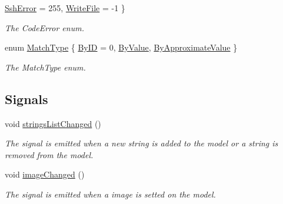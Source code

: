 \begin{DoxyCompactItemize}
\mbox{\hyperlink{classContextualizationController_acb38587f7f9e610a5950956b345d69fda7447fb0b9cf45b0adc6da65c65c34253}{Ssh\+Error}} = 255, 
\mbox{\hyperlink{classContextualizationController_acb38587f7f9e610a5950956b345d69fda841e3c0b31b4da700505de6d3b30dabe}{Write\+File}} = -\/1
 \}
\begin{DoxyCompactList}\small\item\em The Code\+Error enum. \end{DoxyCompactList}\item 
enum \mbox{\hyperlink{classContextualizationController_a211b7dd2dba820139e8055b4f88fdced}{Match\+Type}} \{ \mbox{\hyperlink{classContextualizationController_a211b7dd2dba820139e8055b4f88fdcedab921b1883492c5a7511b20ec6a5f24f3}{By\+ID}} = 0, 
\mbox{\hyperlink{classContextualizationController_a211b7dd2dba820139e8055b4f88fdceda0e89844c93d199f9e314fc1a1ddae400}{By\+Value}}, 
\mbox{\hyperlink{classContextualizationController_a211b7dd2dba820139e8055b4f88fdceda54d0f26a3c6d7f680f2bcbd383f1d9df}{By\+Approximate\+Value}}
 \}
\begin{DoxyCompactList}\small\item\em The Match\+Type enum. \end{DoxyCompactList}\end{DoxyCompactItemize}
\subsection*{Signals}
\begin{DoxyCompactItemize}
\item 
\mbox{\label{classContextualizationController_a0040eddc367f6685480818a2fd9d7a25}} 
void \mbox{\hyperlink{classContextualizationController_a0040eddc367f6685480818a2fd9d7a25}{strings\+List\+Changed}} ()
\begin{DoxyCompactList}\small\item\em The signal is emitted when a new string is added to the model or a string is removed from the model. \end{DoxyCompactList}\item 
\mbox{\label{classContextualizationController_ac101eb9c6edbc62b829257c4cfcc9fe1}} 
void \mbox{\hyperlink{classContextualizationController_ac101eb9c6edbc62b829257c4cfcc9fe1}{image\+Changed}} ()
\begin{DoxyCompactList}\small\item\em The signal is emitted when a image is setted on the model. \end{DoxyCompactList}\end{DoxyCompactItemize}
